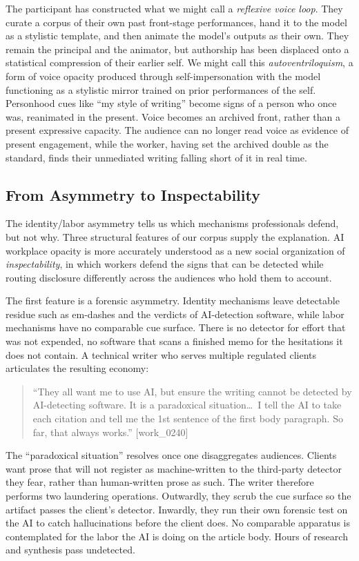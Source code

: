 \documentclass[pdflatex,sn-basic]{sn-jnl}%
\theoremstyle{thmstyleone}%
\theoremstyle{thmstyletwo}%
\theoremstyle{thmstylethree}%
\begin{document}
The participant has constructed what we might call a \textit{reflexive voice loop}. They curate a corpus of their own past front-stage performances, hand it to the model as a stylistic template, and then animate the model's outputs as their own. They remain the principal and the animator, but authorship has been displaced onto a statistical compression of their earlier self. We might call this \textit{autoventriloquism}, a form of voice opacity produced through self-impersonation with the model functioning as a stylistic mirror trained on prior performances of the self. Personhood cues like ``my style of writing'' become signs of a person who once was, reanimated in the present. Voice becomes an archived front, rather than a present expressive capacity. The audience can no longer read voice as evidence of present engagement, while the worker, having set the archived double as the standard, finds their unmediated writing falling short of it in real time.

\subsection{From Asymmetry to Inspectability}

The identity/labor asymmetry tells us which mechanisms professionals defend, but not why. Three structural features of our corpus supply the explanation. AI workplace opacity is more accurately understood as a new social organization of \textit{inspectability}, in which workers defend the signs that can be detected while routing disclosure differently across the audiences who hold them to account.
 
The first feature is a forensic asymmetry. Identity mechanisms leave detectable residue such as em-dashes and the verdicts of AI-detection software, while labor mechanisms have no comparable cue surface. There is no detector for effort that was not expended, no software that scans a finished memo for the hesitations it does not contain. A technical writer who serves multiple regulated clients articulates the resulting economy:

\begin{quote}
``They all want me to use AI, but ensure the writing cannot be detected by AI-detecting software. It is a paradoxical situation\ldots\ I tell the AI to take each citation and tell me the 1st sentence of the first body paragraph. So far, that always works.'' [work\_0240]
\end{quote}

The ``paradoxical situation'' resolves once one disaggregates audiences. Clients want prose that will not register as machine-written to the third-party detector they fear, rather than human-written prose as such. The writer therefore performs two laundering operations. Outwardly, they scrub the cue surface so the artifact passes the client's detector. Inwardly, they run their own forensic test on the AI to catch hallucinations before the client does. No comparable apparatus is contemplated for the labor the AI is doing on the article body. Hours of research and synthesis pass undetected. 
 
\end{document}
